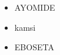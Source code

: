 \documentclass{article}
\begin{document}
	\begin{itemize}
		\item AYOMIDE
		\item kamsi
		\item EBOSETA
	\end{itemize}
\end{document}
